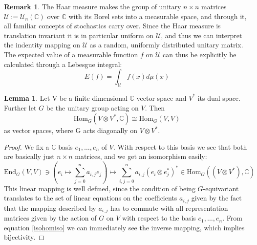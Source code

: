 \documentclass{article}
\def\C{\mathbb{C}}
\def\U{\mathcal{U}}
\def\End{\text{End}}
\def\Hom{\text{Hom}}
\def\fa{\text{ for all }}
\theoremstyle{definition}
\newtheorem{rem}[Satz]{Remark}
\newtheorem{lem}[Satz]{Lemma}
\begin{document}
\begin{rem}
The Haar measure makes the group of unitary $n \times n$ matrices $\U:=\U_n(\C)$ over $\C$ with its Borel sets into a measurable space, and through it, all familiar concepts of stochastics carry over.
Since the Haar measure is translation invariant it is in particular uniform on $\U$, and thus we can interpret the indentity mapping on $\U$ as a random, uniformly distributed unitary matrix.
The expected value of a measurable function $f$ on $\U$ can thus be explicitly be calculated through a Lebesgue integral: 
\begin{equation}
E(f) = \int_{\U} f(x) d\mu(x)
\end{equation}
\end{rem}

\begin{lem}\label{homiso}
Let V be a finite dimensional $\C$ vector space and $V^*$ its dual space. Further let $G$ be the unitary group acting on $V$. Then \begin{equation} \Hom_{G}(V \otimes V^*, \C) \cong \Hom_{G}(V,V) \end{equation} as vector spaces, where G acts diagonally on $V \otimes V^*$.
\begin{proof}
We fix a $\C$ basis $e_1, \ldots, e_n$ of $V$. With respect to this basis we see that both are basically just $n \times n$ matrices, and we get an isomorphism easily: 
\begin{equation}\label{isohomiso} \End_G(V,V) \ni (e_i \mapsto \sum_{j=0}^n a_{i,j}e_j) \mapsto \sum_{i,j=0}^n a_{i,j} (e_i \otimes e^*_j)^* \in \Hom_G((V \otimes V^*),\C) \end{equation}
This linear mapping is well defined, since the condition of being $G$-equivariant translates to the set of linear equations on the coefficients $a_{i,j}$ given by the fact that the mapping described by $a_{i,j}$ has to commute with all
representation matrices given by the action of $G$ on $V$ with respect to the basis $e_1, \ldots, e_n$. From equation \ref{isohomiso} we can immediately see the inverse mapping, which implies bijectivity.
\end{proof}
\end{lem}
\end{document}
